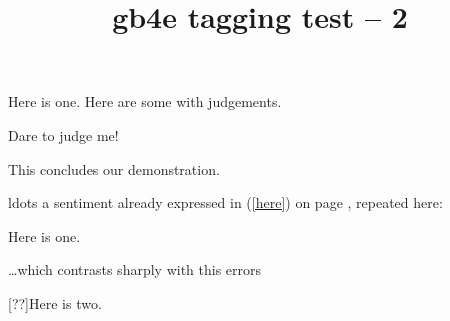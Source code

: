 \documentclass{article}
\title{gb4e tagging test -- 2}
\begin{document}
\begin{exe} %
\ex\label{here} Here is one. %
\ex Here are some with judgements.
\begin{xlist} %
\ex %
\begin{xlist} %
\end{xlist} %
\ex Dare to judge me!
\end{xlist} %
\ex This concludes our demonstration.
\end{exe}

ldots a sentiment already expressed in (\ref{here})
on page \pageref{here}, repeated here:
\begin{exe}
 Here is one.
\end{exe}

\ldots which contrasts sharply with
 this errors
\begin{exe}
[??]{Here is two.}
\end{exe}
\end{document}
